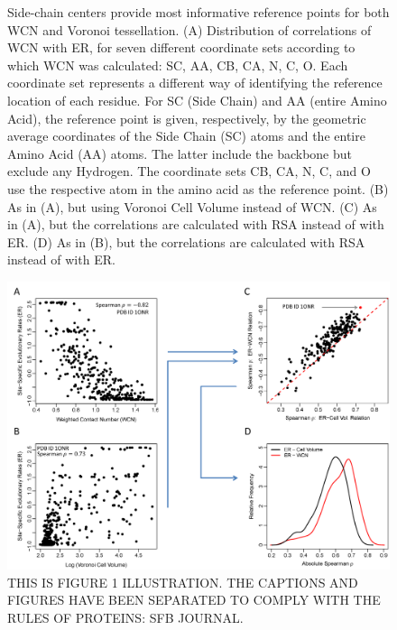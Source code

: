 \documentclass[12pt]{article}
\begin{document}
    \begin{figure}
        \caption{Side-chain centers provide most informative reference points for both WCN and Voronoi tessellation. (A) Distribution of correlations of WCN with ER, for seven different coordinate sets according to which WCN was calculated: SC, AA, CB, CA, N, C, O. Each coordinate set represents a different way of identifying the reference location of each residue. For SC (Side Chain) and AA (entire Amino Acid), the reference point is given, respectively, by the geometric average coordinates of the Side Chain (SC) atoms and the entire Amino Acid (AA) atoms. The latter include the backbone but exclude any Hydrogen. The coordinate sets CB, CA, N, C, and O use the respective atom in the amino acid as the reference point. (B) As in (A), but using Voronoi Cell Volume instead of WCN. (C) As in (A), but the correlations are calculated with RSA instead of with ER. (D) As in (B), but the correlations are calculated with RSA instead of with ER.}
        \label{fig:best_wcn_vvol}
    \end{figure}


    \begin{figure}[h]
        \begin{center}
        \includegraphics[width=6in]{pipeline.png}
        \end{center}
        \caption{THIS IS FIGURE 1 ILLUSTRATION. THE CAPTIONS AND FIGURES HAVE BEEN SEPARATED TO COMPLY WITH THE RULES OF PROTEINS: SFB JOURNAL.}
        \label{fig:pipeline}
    \end{figure}
\end{document}
